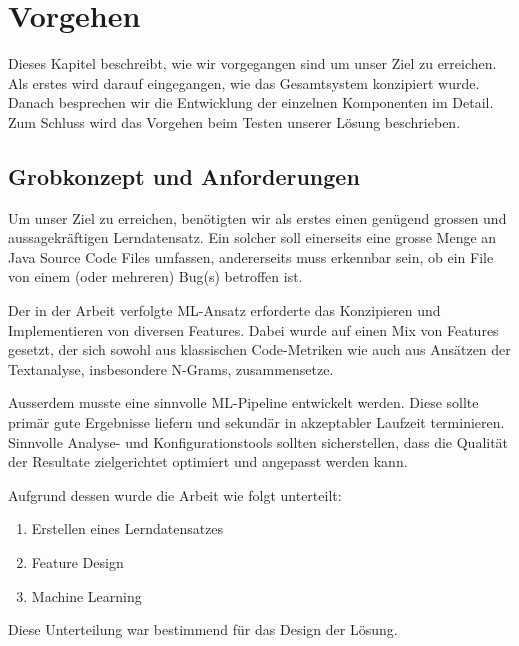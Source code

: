 \documentclass[10pt, a4paper]{article}
\begin{document}
\section{Vorgehen}

Dieses Kapitel beschreibt, wie wir vorgegangen sind um unser Ziel zu erreichen. Als erstes wird darauf eingegangen, wie das Gesamtsystem konzipiert wurde. Danach besprechen wir die Entwicklung der einzelnen Komponenten im Detail. Zum Schluss wird das Vorgehen beim Testen unserer Lösung beschrieben.

\subsection{Grobkonzept und Anforderungen}
Um unser Ziel zu erreichen, benötigten wir als erstes einen genügend grossen und aussagekräftigen Lerndatensatz. Ein solcher soll einerseits eine grosse Menge an Java Source Code Files umfassen, andererseits muss erkennbar sein, ob ein File von einem (oder mehreren) Bug(s) betroffen ist.

Der in der Arbeit verfolgte \ac{ML}-Ansatz erforderte das Konzipieren und Implementieren von diversen Features. Dabei wurde auf einen Mix von Features gesetzt, der sich sowohl aus klassischen Code-Metriken wie auch aus Ansätzen der Textanalyse, insbesondere N-Grams, zusammensetze.

Ausserdem musste eine sinnvolle \ac{ML}-Pipeline entwickelt werden. Diese sollte primär gute Ergebnisse liefern und sekundär in akzeptabler Laufzeit terminieren. Sinnvolle Analyse- und Konfigurationstools sollten sicherstellen, dass die Qualität der Resultate zielgerichtet optimiert und angepasst werden kann.

Aufgrund dessen wurde die Arbeit wie folgt unterteilt:
\begin{enumerate}
	\item Erstellen eines Lerndatensatzes
	\item Feature Design
	\item Machine Learning
\end{enumerate}
Diese Unterteilung war bestimmend für das Design der Lösung.
\end{document}
